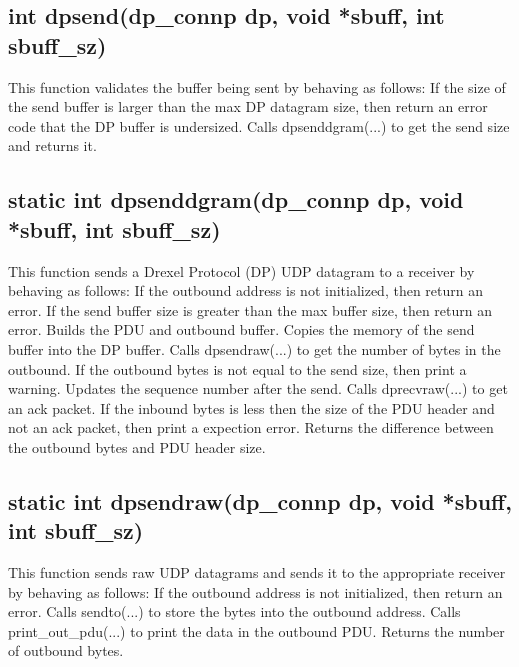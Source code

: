 \documentclass[12pt, a4paper]{article}
\begin{document}
{\subsection{int dpsend(dp\_connp dp, void *sbuff, int sbuff\_sz)}
This function validates the buffer being sent by behaving as follows: \newline
\indent If the size of the send buffer is larger than the max DP datagram size, \newline
\indent\indent then return an error code that the DP buffer is undersized. \newline
\indent Calls dpsenddgram(...) to get the send size and returns it.

\subsection{static int dpsenddgram(dp\_connp dp, void *sbuff, int sbuff\_sz)}
This function sends a Drexel Protocol (DP) UDP datagram to a receiver by behaving as follows: \newline
\indent If the outbound address is not initialized, then return an error. \newline
\indent If the send buffer size is greater than the max buffer size, then return an \newline
\indent\indent error. \newline
\indent Builds the PDU and outbound buffer. \newline
\indent Copies the memory of the send buffer into the DP buffer. \newline
\indent Calls dpsendraw(...) to get the number of bytes in the outbound. \newline
\indent If the outbound bytes is not equal to the send size, then print a warning. \newline
\indent Updates the sequence number after the send. \newline
\indent Calls dprecvraw(...) to get an ack packet. If the inbound bytes is less \newline
\indent\indent then the size of the PDU header and not an ack packet, then print \newline
\indent\indent a expection error. \newline
\indent Returns the difference between the outbound bytes and PDU header size.

\subsection{static int dpsendraw(dp\_connp dp, void *sbuff, int sbuff\_sz)}
This function sends raw UDP datagrams and sends it to the appropriate receiver by behaving as follows: \newline
\indent If the outbound address is not initialized, then return an error. \newline
\indent Calls sendto(...) to store the bytes into the outbound address. \newline
\indent Calls print\_out\_pdu(...) to print the data in the outbound PDU. \newline
\indent Returns the number of outbound bytes.

}
\end{document}
